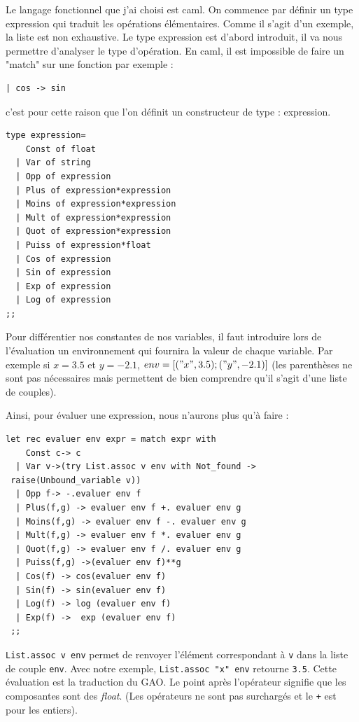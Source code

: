 Le langage fonctionnel que j'ai choisi est caml. On commence par d\'efinir un type expression qui traduit les op\'erations \'el\'ementaires. Comme il
 s'agit d'un exemple, la liste est non exhaustive. Le type expression est d'abord introduit, il va nous permettre d'analyser le type d'op\'eration.
En caml, il est impossible de faire un "match" sur une fonction par exemple : \begin{verbatim}| cos -> sin \end{verbatim}
c'est pour cette raison que l'on d\'efinit un constructeur de type : expression. 
{\small
\begin{verbatim}
type expression= 
    Const of float
  | Var of string
  | Opp of expression
  | Plus of expression*expression
  | Moins of expression*expression
  | Mult of expression*expression
  | Quot of expression*expression
  | Puiss of expression*float
  | Cos of expression
  | Sin of expression
  | Exp of expression
  | Log of expression
;;
\end{verbatim}
}
\noindent
Pour diff\'erentier nos constantes de nos variables, il faut introduire lors de l'\'evaluation un
environnement qui fournira la valeur de chaque variable. Par exemple si $x=3.5$ et $y=-2.1$,
$env=[("x",3.5);("y",-2.1)]$ (les parenth\`eses ne sont pas n\'ecessaires mais permettent de bien
comprendre qu'il s'agit d'une liste de couples).


Ainsi, pour \'evaluer une expression, nous n'aurons plus qu'\`a faire :

\begin{verbatim}
let rec evaluer env expr = match expr with
    Const c-> c 
  | Var v->(try List.assoc v env with Not_found ->
 raise(Unbound_variable v))
  | Opp f-> -.evaluer env f
  | Plus(f,g) -> evaluer env f +. evaluer env g
  | Moins(f,g) -> evaluer env f -. evaluer env g
  | Mult(f,g) -> evaluer env f *. evaluer env g
  | Quot(f,g) -> evaluer env f /. evaluer env g
  | Puiss(f,g) ->(evaluer env f)**g
  | Cos(f) -> cos(evaluer env f)
  | Sin(f) -> sin(evaluer env f)
  | Log(f) -> log (evaluer env f)
  | Exp(f) ->  exp (evaluer env f)
 ;;
\end{verbatim}
\noindent
{\tt List.assoc v env} permet de renvoyer l'\'el\'ement correspondant \`a {\tt v} dans la liste de couple {\tt env}. Avec notre exemple,
{\tt List.assoc "x" env} retourne {\tt 3.5}. Cette \'evaluation est la traduction du GAO. Le point apr\`es l'op\'erateur signifie que les composantes sont des {\it float}. (Les op\'erateurs
ne sont pas surcharg\'es et le \verb!+! est pour les entiers).


